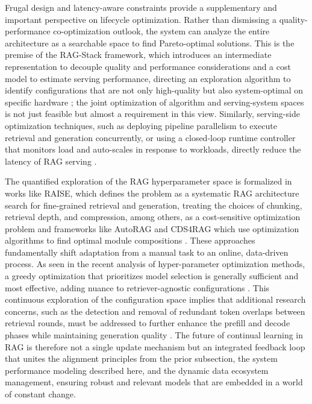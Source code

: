\documentclass[11pt,a4paper]{article}
\begin{document}
Frugal design and latency-aware constraints provide a supplementary and important perspective on lifecycle optimization. Rather than dismissing a quality-performance co-optimization outlook, the system can analyze the entire architecture as a searchable space to find Pareto-optimal solutions. This is the premise of the RAG-Stack framework, which introduces an intermediate representation to decouple quality and performance considerations and a cost model to estimate serving performance, directing an exploration algorithm to identify configurations that are not only high-quality but also system-optimal on specific hardware \cite{arxiv:2510.20296v1}; the joint optimization of algorithm and serving-system spaces is not just feasible but almost a requirement in this view. Similarly, serving-side optimization techniques, such as deploying pipeline parallelism to execute retrieval and generation concurrently, or using a closed-loop runtime controller that monitors load and auto-scales in response to workloads, directly reduce the latency of RAG serving \cite{arxiv:2403.05676v1,arxiv:2505.07833v2}.

The quantified exploration of the RAG hyperparameter space is formalized in works like RAISE, which defines the problem as a systematic RAG architecture search for fine-grained retrieval and generation, treating the choices of chunking, retrieval depth, and compression, among others, as a cost-sensitive optimization problem \cite{arxiv:2605.30029v1} and frameworks like AutoRAG and CDS4RAG which use optimization algorithms to find optimal module compositions \cite{arxiv:2410.20878v1,arxiv:2605.08333v1}. These approaches fundamentally shift adaptation from a manual task to an online, data-driven process. As seen in the recent analysis of hyper-parameter optimization methods, a greedy optimization that prioritizes model selection is generally sufficient and most effective, adding nuance to retriever-agnostic configurations \cite{arxiv:2505.03452v3}. This continuous exploration of the configuration space implies that additional research concerns, such as the detection and removal of redundant token overlaps between retrieval rounds, must be addressed to further enhance the prefill and decode phases while maintaining generation quality \cite{arxiv:2505.12731v2}. The future of continual learning in RAG is therefore not a single update mechanism but an integrated feedback loop that unites the alignment principles from the prior subsection, the system performance modeling described here, and the dynamic data ecosystem management, ensuring robust and relevant models that are embedded in a world of constant change.
\end{document}
